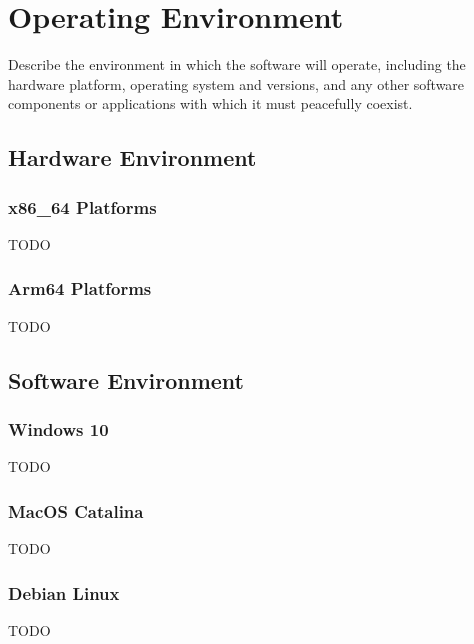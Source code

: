 \section{Operating Environment} \label{sec:operatingenvironment}

Describe the environment in which the software will operate, including the 
hardware platform, operating system and versions, and any other software 
components or applications with which it must peacefully coexist.

\subsection{Hardware Environment}
\subsubsection{x86_64 Platforms}
TODO

\subsubsection{Arm64 Platforms}
TODO

\subsection{Software Environment}
\subsubsection{Windows 10}
TODO

\subsubsection{MacOS Catalina}
TODO

\subsubsection{Debian Linux}
TODO

